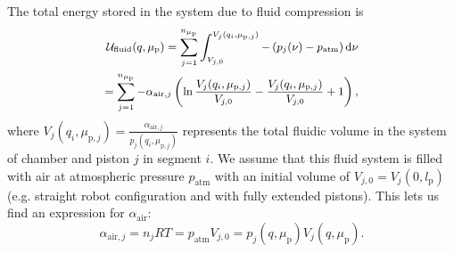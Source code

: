 The total energy stored in the system due to fluid compression is
%
\begin{equation}\small
\begin{split}
	\mathcal{U}_\mathrm{fluid}(q,\mu_\mathrm{p}) = \sum_{j = 1}^{n_{\mu_\mathrm{p}}} \int_{V_{j,0}}^{V_j(q_i,\mu_{\mathrm{p},j})} -\left ( p_j(\nu) - p_\mathrm{atm} \right ) \mathrm{d} \nu\\
	= \sum_{j=1}^{n_{\mu_\mathrm{p}}} - \alpha_{\mathrm{air},j} \left ( \ln  \frac{V_j(q_i, \mu_{\mathrm{p},j})}{V_{j,0}} - \frac{V_j(q_i, \mu_{\mathrm{p},j})}{V_{j,0}} + 1 \right ),
\end{split}
\end{equation}
%
where $V_j(q_i, \mu_{\mathrm{p},j}) = \frac{\alpha_{\mathrm{air},j}}{p_j(q_i, \mu_{\mathrm{p},j})}$ represents the total fluidic volume in the system of chamber and piston $j$ in segment $i$. We assume that this fluid system is filled with air at atmospheric pressure $p_\mathrm{atm}$ with an initial volume of $V_{j,0} = V_j(0, l_\mathrm{p})$ (e.g. straight robot configuration and with fully extended pistons). 
This lets us find an expression for $\alpha_{\mathrm{air}}$:
\begin{equation}
    \alpha_{\mathrm{air},j} = n_j R T = p_\mathrm{atm} V_{j,0} = p_{j}(q,\mu_\mathrm{p}) V_{j}(q,\mu_\mathrm{p}).
\end{equation}
%

